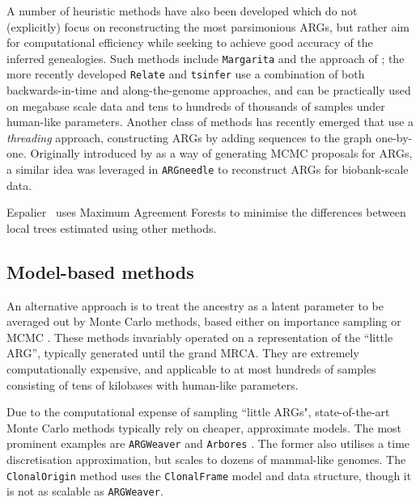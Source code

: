 \documentclass{article}
\begin{document}
A number of heuristic methods have also been developed which do not (explicitly) focus on reconstructing
the most parsimonious ARGs, but rather aim for computational efficiency while seeking to achieve good
accuracy of the inferred genealogies. Such methods include \texttt{Margarita} \citep{minichiello2006mapping}
and the approach of \citet{parida2008estimating}; the more recently developed \texttt{Relate}
\citep{speidel2019method} and \texttt{tsinfer} \citep{kelleher2019inferring} use a combination of both
backwards-in-time and along-the-genome approaches, and can be practically used on megabase scale data
and tens to hundreds of thousands of samples under human-like parameters.
Another class of methods has recently emerged that use a \emph{threading} approach, constructing ARGs
by adding sequences to the graph one-by-one. Originally introduced by \citet{rasmussen2014genome} as a
way of generating MCMC proposals for ARGs, a similar idea was leveraged in \texttt{ARGneedle}
\citep{zhang2021biobank} to reconstruct ARGs for biobank-scale data.

Espalier~\citep{rasmussen2022espalier} uses Maximum Agreement Forests to
minimise the differences between local trees estimated using other methods.

\subsection*{Model-based methods}
An alternative approach is to treat the ancestry as a latent parameter to be averaged out
by Monte Carlo methods, based either on importance sampling
\citep{griffiths1996ancestral, fearnhead2001estimating, jenkins2011inference}
or MCMC \citep{kuhner2000maximum, nielsen2000estimation, wang2008bayesian, fallon2013acg}.
These methods invariably operated on a representation of the ``little ARG'', typically
generated until the grand MRCA. They are extremely computationally expensive,
and applicable to at most hundreds of samples consisting of tens of kilobases with
human-like parameters.

Due to the computational expense of sampling ``little ARGs", state-of-the-art
Monte Carlo methods typically rely on cheaper, approximate models.
The most prominent examples are \texttt{ARGWeaver} \citep{rasmussen2014genome}
and \texttt{Arbores} \citep{heine2018bridging}. The former also utilises a time
discretisation approximation, but scales to dozens of mammal-like genomes.
The \texttt{ClonalOrigin} method \citep{didelot2010inference,
medina2020speeding} uses the \texttt{ClonalFrame}
model and data structure, though it is not as scalable as \texttt{ARGWeaver}.
\end{document}
